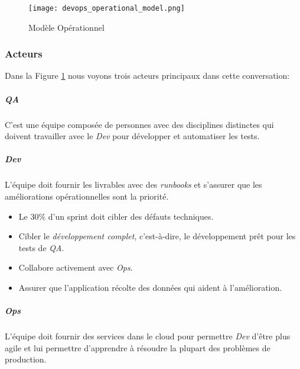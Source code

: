 \begin{figure}[!ht]
\centering
\texttt{[image: devops\_operational\_model.png]}
\caption{Modèle Opérationnel \cite{IsaacSacolick2016DrivingCulture}}
\label{fig:devops_operational_model}
\end{figure}


\subsubsection{Acteurs}
Dans la Figure \ref{fig:devops_operational_model} nous voyons trois acteurs principaux dans cette conversation:

\subparagraph{QA}
C'est une équipe composée de personnes avec des disciplines distinctes qui doivent travailler avec le \textit{Dev} pour développer et automatiser les tests.
\subparagraph{Dev} L'équipe doit fournir les livrables avec des \emph{runbooks} et s’assurer que les améliorations opérationnelles sont la priorité.
\begin{itemize}
  \item Le 30\% d'un sprint doit cibler des défauts techniques.
  \item Cibler le \emph{développement complet}, c'est-à-dire, le développement prêt pour les tests de \textit{QA}.
  \item Collabore activement avec \textit{Ops}.
  \item Assurer que l'application récolte des données qui aident à l'amélioration.
\end{itemize}
\subparagraph{Ops}
L'équipe doit fournir des services dans le cloud pour permettre \textit{Dev} d’être plus agile et lui permettre d'apprendre à résoudre la plupart des problèmes de production.
